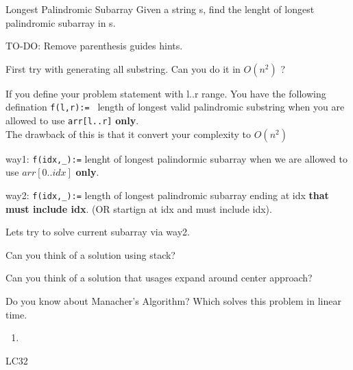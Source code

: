 \begin{problem}{Longest Palindromic Subarray}
    Given a string s, find the lenght of longest palindromic subarray in s.

    
\end{problem}

\begin{solution}

    \begin{guide}
        TO-DO: Remove parenthesis guides hints.
        
        \item First try with generating all substring. Can you do it in $O(n^2)$ ?

        \item
        If you define your problem statement with l..r range. You have the following defination \verb|f(l,r):= | length of longest valid palindromic substring when you are allowed to use \verb|arr[l..r]| \textbf{only}. \\
        The drawback of this is that it convert your complexity to $O(n^2)$

        \item
        
        way1: \verb|f(idx,_):=| lenght of longest palindormic subarray when we are allowed to use $arr[0..idx]$ \textbf{only}.

        way2: \verb|f(idx,_):=| length of longest palindromic subarray ending at idx \textbf{that must include idx}. (OR startign at idx and must include idx). 

       Lets try to solve current subarray via way2.

       \item Can you think of a solution using stack?
       
       \item Can you think of a solution that usages expand around center approach?
       
       \item Do you know about Manacher's Algorithm? Which solves this problem in linear time.
    


    \end{guide}
\end{solution}

\begin{pratice}

    \begin{enumerate}
        \item 
    \end{enumerate}

\end{pratice}

\begin{praticeHints}
    \item LC32 
\end{praticeHints}